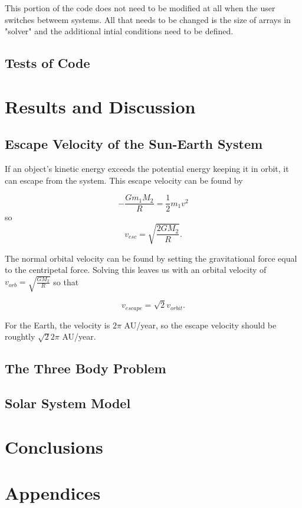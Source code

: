 \documentclass[%
oneside,                 %
final,                   %
10pt]{article}
\begin{document}
This portion of the code does not need to be modified at all when the user switches betweem systems.  All that needs to be changed is the size of arrays in "solver" and the additional intial conditions need to be defined.

\subsection{Tests of Code}

\section{Results and Discussion}


\subsection{Escape Velocity of the Sun-Earth System}

If an object's kinetic energy exceeds the potential energy keeping it in orbit, it can escape from the system.  This escape velocity can be found by

\[
-\frac{G m_1 M_2}{R}=\frac{1}{2}m_1 v^2
\]
so 
\[
v_{esc}=\sqrt{\frac{2GM_2}{R}}.
\]

The normal orbital velocity can be found by setting the gravitational force equal to the centripetal force.  Solving this leaves us with an orbital velocity of $v_{orb}=\sqrt{\frac{GM_2}{R}}$ so that

\[
v_{escape}=\sqrt{2}v_{orbit}.
\]

For the Earth, the velocity is $2 \pi$ AU/year, so the escape velocity should be roughtly $\sqrt{2}2\pi$ AU/year.

\subsection{The Three Body Problem}

\subsection{Solar System Model}


\section{Conclusions}


\section{Appendices}
\end{document}
